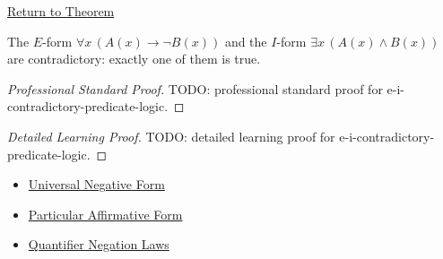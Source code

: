 \newpage
{}
\label{prf:e-i-contradictory-predicate-logic}

\begin{remark*}[Return]
\hyperref[prop:e-i-contradictory-predicate-logic]{Return to Theorem}
\end{remark*}

\begin{proposition*}[E-I Contradiction]
The \(E\)-form \(\forall x\,(A(x)\to \neg B(x))\) and the \(I\)-form
\(\exists x\,(A(x)\land B(x))\) are contradictory: exactly one of them is true.
\end{proposition*}

\begin{proof}[Professional Standard Proof]
\LRAProofBodyStart
TODO: professional standard proof for e-i-contradictory-predicate-logic.
\end{proof}

\begin{proof}[Detailed Learning Proof]
\LRAProofBodyStart
TODO: detailed learning proof for e-i-contradictory-predicate-logic.
\end{proof}

\begin{remark*}
\end{remark*}

\begin{dependencies}
\begin{itemize}
  \item \hyperref[def:categorical-e-form-predicate-logic]{Universal Negative Form}
  \item \hyperref[def:categorical-i-form-predicate-logic]{Particular Affirmative Form}
  \item \hyperref[thm:qneg]{Quantifier Negation Laws}
\end{itemize}
\end{dependencies}

\clearpage
